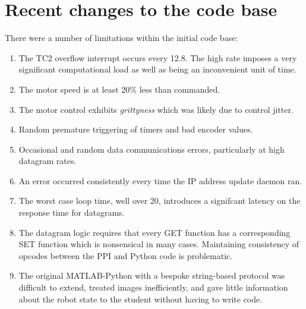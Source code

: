\documentclass[11pt,fleqn]{article}
\begin{document}
\section{Recent changes to the code base}

There were a number of limitations within the initial code base:
\begin{enumerate}
\item The TC2 overflow interrupt occurs every 12.8\us.  The high rate imposes a very significant computational load as well as being
an inconvenient unit of time.

\item The motor speed is at least 20\% less than commanded.  

\item The motor control exhibits  \textit{grittyness} which was likely due to control jitter.  

\item Random premature triggering of timers and bad encoder values.

\item Occasional and random data communications errors, particularly at high datagram rates.  

\item An error  occurred consistently every time the IP address update daemon ran.

\item The worst case loop time, well over 20\ms, introduces a signifcant latency on the response time for datagrams.  

\item The datagram logic requires that every GET function has a corresponding SET function which is nonsensical in many cases.
Maintaining consistency of opcodes between the PPI and Python code is problematic.


\item The original MATLAB-Python with a bespoke string-based protocol was difficult to extend, treated images inefficiently, and gave little information about the robot state to the student without having to write code.

\end{enumerate}
\end{document}
